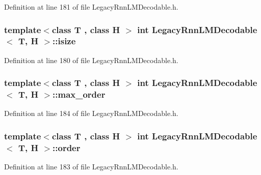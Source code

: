 Definition at line 181 of file Legacy\+Rnn\+L\+M\+Decodable.\+h.

\subsubsection[{isize}]{\setlength{\rightskip}{0pt plus 5cm}template$<$class T , class H $>$ int {\bf Legacy\+Rnn\+L\+M\+Decodable}$<$ T, H $>$\+::isize}\hypertarget{class_legacy_rnn_l_m_decodable_ac899e290ea40c5997b00d3af5de5f7c8}{}\label{class_legacy_rnn_l_m_decodable_ac899e290ea40c5997b00d3af5de5f7c8}


Definition at line 180 of file Legacy\+Rnn\+L\+M\+Decodable.\+h.

\subsubsection[{max\+\_\+order}]{\setlength{\rightskip}{0pt plus 5cm}template$<$class T , class H $>$ int {\bf Legacy\+Rnn\+L\+M\+Decodable}$<$ T, H $>$\+::max\+\_\+order}\hypertarget{class_legacy_rnn_l_m_decodable_a8ab81cdd5fa61deb053ffd5af6211188}{}\label{class_legacy_rnn_l_m_decodable_a8ab81cdd5fa61deb053ffd5af6211188}


Definition at line 184 of file Legacy\+Rnn\+L\+M\+Decodable.\+h.

\subsubsection[{order}]{\setlength{\rightskip}{0pt plus 5cm}template$<$class T , class H $>$ int {\bf Legacy\+Rnn\+L\+M\+Decodable}$<$ T, H $>$\+::order}\hypertarget{class_legacy_rnn_l_m_decodable_a950aa47a348fabd66d93ac224c86f331}{}\label{class_legacy_rnn_l_m_decodable_a950aa47a348fabd66d93ac224c86f331}


Definition at line 183 of file Legacy\+Rnn\+L\+M\+Decodable.\+h.

